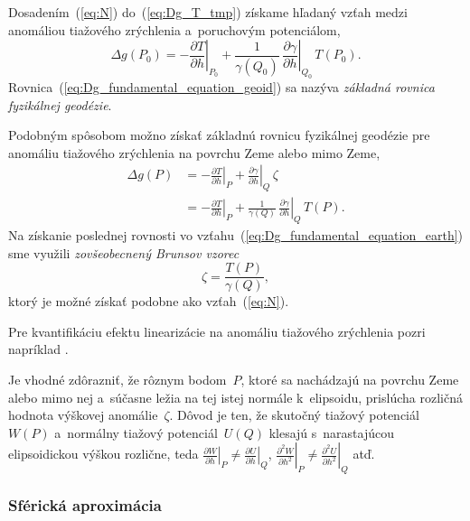\documentclass[a4paper, 12pt]{book}
\begin{document}
Dosadením~(\ref{eq:N}) do~(\ref{eq:Dg_T_tmp}) získame hľadaný vzťah medzi 
anomáliou tiažového zrýchlenia a~poruchovým potenciálom,
%
\begin{equation}
\label{eq:Dg_fundamental_equation_geoid}
\Delta g(P_0) = -\left.\frac{\partial T}{\partial h}\right|_{P_0} 
+ \frac{1}{\gamma(Q_0)} \, \left.\frac{\partial \gamma}{\partial 
h}\right|_{Q_0} \, T(P_0){.}
\end{equation}
%
Rovnica~(\ref{eq:Dg_fundamental_equation_geoid}) sa nazýva \emph{základná 
rovnica fyzikálnej geodézie}.

Podobným spôsobom možno získať základnú rovnicu fyzikálnej geodézie pre 
anomáliu tiažového zrýchlenia na povrchu Zeme alebo mimo Zeme,
%
\begin{equation}
\label{eq:Dg_fundamental_equation_earth}
\begin{split}
\Delta g(P) &= -\left.\frac{\partial T}{\partial h}\right|_{P} 
+ \left.\frac{\partial \gamma}{\partial h}\right|_{Q} \, \zeta\\
%
&= -\left.\frac{\partial T}{\partial h}\right|_{P} + \frac{1}{\gamma(Q)} \, 
\left.\frac{\partial \gamma}{\partial h}\right|_{Q} \, T(P){.}
\end{split}
\end{equation}
%
Na získanie poslednej rovnosti vo 
vzťahu~(\ref{eq:Dg_fundamental_equation_earth}) sme využili \emph{zovšeobecnený 
Brunsov vzorec}
%
\begin{equation}
\label{eq:zeta}
\zeta = \frac{T(P)}{\gamma(Q)}{,}
\end{equation}
%
ktorý je možné získať podobne ako vzťah~(\ref{eq:N}).

Pre kvantifikáciu efektu linearizácie na anomáliu tiažového zrýchlenia pozri 
napríklad \textcite{Claessens2006}.

Je vhodné zdôrazniť, že rôznym bodom~$P$, ktoré sa nachádzajú na povrchu Zeme 
alebo mimo nej a~súčasne ležia na tej istej normále k~elipsoidu, prislúcha 
rozličná hodnota výškovej anomálie~$\zeta$.  Dôvod je ten, že skutočný tiažový 
potenciál~$W(P)$ a~normálny tiažový potenciál~$U(Q)$ klesajú s~narastajúcou 
elipsoidickou výškou rozlične, teda $\left.\frac{\partial W}{\partial 
h}\right|_P \neq \left.\frac{\partial U}{\partial h}\right|_Q$, 
$\left.\frac{\partial^2 W}{\partial h^2}\right|_P \neq \left.\frac{\partial^2 
U}{\partial h^2}\right|_Q$ atď.

\subsubsection{Sférická aproximácia}
\end{document}
